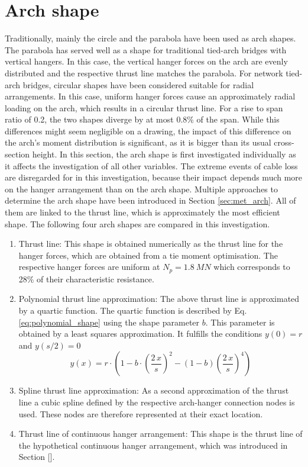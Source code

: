 \newpage
\section{Arch shape}
Traditionally, mainly the circle and the parabola have been used as arch shapes. The parabola has served well as a shape for traditional tied-arch bridges with vertical hangers. In this case, the vertical hanger forces on the arch are evenly distributed and the respective thrust line matches the parabola. For network tied-arch bridges, circular shapes have been considered suitable for radial arrangements. In this case, uniform hanger forces cause an approximately radial loading on the arch, which results in a circular thrust line. For a rise to span ratio of 0.2, the two shapes diverge by at most 0.8\% of the span. While this differences might seem negligible on a drawing, the impact of this difference on the arch's moment distribution is significant, as it is bigger than its usual cross-section height. In this section, the arch shape is first investigated individually as it affects the investigation of all other variables. The extreme events of cable loss are disregarded for in this investigation, because their impact depends much more on the hanger arrangement than on the arch shape.
Multiple approaches to determine the arch shape have been introduced in Section \ref{sec:met_arch}. All of them are linked to the thrust line, which is approximately the most efficient shape. The following four arch shapes are compared in this investigation.
\begin{enumerate}
    \item Thrust line: This shape is obtained numerically as the thrust line for the hanger forces, which are obtained from a tie moment optimisation. The respective hanger forces are uniform at $N_p=\SI{1.8}{MN}$ which corresponds to 28\% of their characteristic resistance.
    \item Polynomial thrust line approximation: The above thrust line is approximated by a quartic function. The quartic function is described by Eq. \eqref{eq:polynomial_shape} using the shape parameter $b$. This parameter is obtained by a least squares approximation. It fulfills the conditions $y(0)=r$ and $y(s/2)=0$
    \begin{equation}
        y(x)=r \cdot \left(1 - b \cdot \left(\frac{2\,x}{s}\right)^2 - (1-b) \left(\frac{2\,x}{s}\right)^4 \right)
        \label{eq:polynomial_shape}
    \end{equation}
    \item Spline thrust line approximation: As a second approximation of the thrust line a cubic spline defined by the respective arch-hanger connection nodes is used. These nodes are therefore represented at their exact location.
    \item Thrust line of continuous hanger arrangement: This shape is the thrust line of the hypothetical continuous hanger arrangement, which was introduced in Section [].
\end{enumerate}

